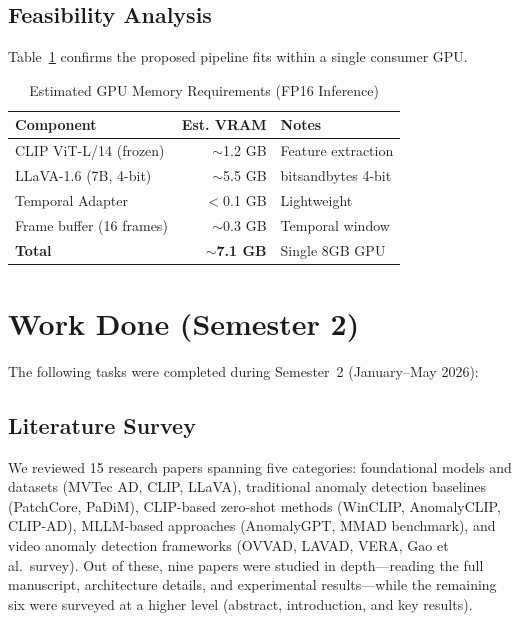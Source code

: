 \subsection{Feasibility Analysis}

Table~\ref{tab:gpu} confirms the proposed pipeline fits within a single consumer GPU.

\begin{table}[h]
\centering
\caption{Estimated GPU Memory Requirements (FP16 Inference)}
\label{tab:gpu}
\renewcommand{\arraystretch}{1.2}
\small
\begin{tabular}{@{} l r l @{}}
\toprule
\textbf{Component} & \textbf{Est. VRAM} & \textbf{Notes} \\
\midrule
CLIP ViT-L/14 (frozen) & $\sim$1.2 GB & Feature extraction \\
LLaVA-1.6 (7B, 4-bit) & $\sim$5.5 GB & bitsandbytes 4-bit \\
Temporal Adapter & $<$0.1 GB & Lightweight \\
Frame buffer (16 frames) & $\sim$0.3 GB & Temporal window \\
\midrule
\textbf{Total} & $\sim$\textbf{7.1 GB} & Single 8GB GPU \\
\bottomrule
\end{tabular}
\end{table}


\section{Work Done (Semester 2)}
\label{sec:work_done}

The following tasks were completed during Semester~2 (January--May 2026):

\subsection{Literature Survey}

We reviewed 15 research papers spanning five categories: foundational models and datasets (MVTec AD, CLIP, LLaVA), traditional anomaly detection baselines (PatchCore, PaDiM), CLIP-based zero-shot methods (WinCLIP, AnomalyCLIP, CLIP-AD), MLLM-based approaches (AnomalyGPT, MMAD benchmark), and video anomaly detection frameworks (OVVAD, LAVAD, VERA, Gao et al.\ survey). Out of these, nine papers were studied in depth---reading the full manuscript, architecture details, and experimental results---while the remaining six were surveyed at a higher level (abstract, introduction, and key results).

